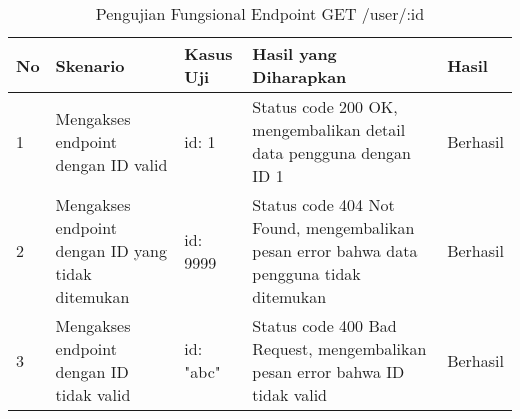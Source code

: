 \begin{table}[H]
    \centering
    \begin{tabular}{|p{0.5cm}|p{3cm}|p{5cm}|p{5cm}|p{1.5cm}|}
        \hline
        \rowcolor[HTML]{DAE8FC} 
        \textbf{No} & \textbf{Skenario} & \textbf{Kasus Uji} & \textbf{Hasil yang Diharapkan} & \textbf{Hasil} \\ \hline
        1 & Mengakses endpoint dengan ID valid & 
        id: 1 & 
        Status code 200 OK, mengembalikan detail data pengguna dengan ID 1 & 
        Berhasil \\ \hline
        2 & Mengakses endpoint dengan ID yang tidak ditemukan & 
        id: 9999 & 
        Status code 404 Not Found, mengembalikan pesan error bahwa data pengguna tidak ditemukan & 
        Berhasil \\ \hline
        3 & Mengakses endpoint dengan ID tidak valid & 
        id: "abc" & 
        Status code 400 Bad Request, mengembalikan pesan error bahwa ID tidak valid & 
        Berhasil \\ \hline
    \end{tabular}
    \caption{Pengujian Fungsional Endpoint GET /user/:id}
    \label{tab:user_getone_testing}
\end{table}
